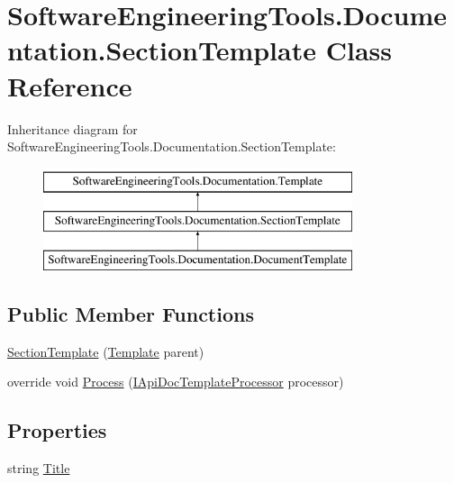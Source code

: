 \hypertarget{class_software_engineering_tools_1_1_documentation_1_1_section_template}{\section{Software\+Engineering\+Tools.\+Documentation.\+Section\+Template Class Reference}
\label{class_software_engineering_tools_1_1_documentation_1_1_section_template}
}
Inheritance diagram for Software\+Engineering\+Tools.\+Documentation.\+Section\+Template\+:\begin{figure}[H]
\begin{center}
\leavevmode
\includegraphics[height=3.000000cm]{class_software_engineering_tools_1_1_documentation_1_1_section_template}
\end{center}
\end{figure}
\subsection*{Public Member Functions}
\begin{DoxyCompactItemize}
\item 
\hyperlink{class_software_engineering_tools_1_1_documentation_1_1_section_template_ab62eccf4428cdfe614b4caceaeb54577}{Section\+Template} (\hyperlink{class_software_engineering_tools_1_1_documentation_1_1_template}{Template} parent)
\item 
override void \hyperlink{class_software_engineering_tools_1_1_documentation_1_1_section_template_afbc012c729c09b854cb6e9635ebc5337}{Process} (\hyperlink{interface_software_engineering_tools_1_1_documentation_1_1_i_api_doc_template_processor}{I\+Api\+Doc\+Template\+Processor} processor)
\end{DoxyCompactItemize}
\subsection*{Properties}
\begin{DoxyCompactItemize}
\item 
string \hyperlink{class_software_engineering_tools_1_1_documentation_1_1_section_template_a59c26c917511184723c57a18b415093e}{Title}
\end{DoxyCompactItemize}


